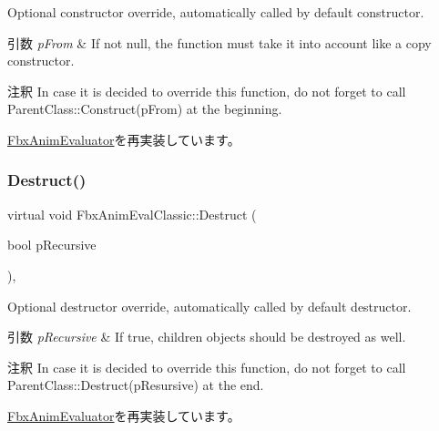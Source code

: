 Optional constructor override, automatically called by default constructor. 
\begin{DoxyParams}{引数}
{\em p\+From} & If not null, the function must take it into account like a copy constructor. \\
\hline
\end{DoxyParams}
\begin{DoxyRemark}{注釈}
In case it is decided to override this function, do not forget to call Parent\+Class\+::\+Construct(p\+From) at the beginning. 
\end{DoxyRemark}


\hyperlink{class_fbx_anim_evaluator_a9f167a7fd55aa593d191fdf014c1b3bd}{Fbx\+Anim\+Evaluator}を再実装しています。

\mbox{\label{class_fbx_anim_eval_classic_a308a42f3bd439a3e36f3b5171d5fc092}} 
\subsubsection{\texorpdfstring{Destruct()}{Destruct()}}
{\footnotesize\ttfamily virtual void Fbx\+Anim\+Eval\+Classic\+::\+Destruct (\begin{DoxyParamCaption}\item[{bool}]{p\+Recursive }\end{DoxyParamCaption})\hspace{0.3cm}{\ttfamily [protected]}, {\ttfamily [virtual]}}

Optional destructor override, automatically called by default destructor. 
\begin{DoxyParams}{引数}
{\em p\+Recursive} & If true, children objects should be destroyed as well. \\
\hline
\end{DoxyParams}
\begin{DoxyRemark}{注釈}
In case it is decided to override this function, do not forget to call Parent\+Class\+::\+Destruct(p\+Resursive) at the end. 
\end{DoxyRemark}


\hyperlink{class_fbx_anim_evaluator_ac425dd202ceb6c0e5adfc86d8c901dd0}{Fbx\+Anim\+Evaluator}を再実装しています。

\mbox{\label{class_fbx_anim_eval_classic_a83f7c6d89964e4ff48e7ad2d325a1eac}} 
